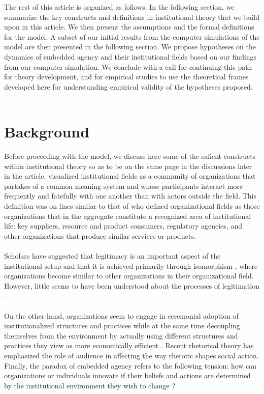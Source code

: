 \documentclass[12pt,letterpaper]{article}
\begin{document}
\noindent The rest of this article is organized as follows. In the following section, we summarize the key constructs and definitions in institutional theory that we build upon in this article. We then present the assumptions and the formal definitions for the model. A subset of our initial results from the computer simulations of the model are then presented in the following section. We propose hypotheses on the dynamics of embedded agency and their institutional fields based on our findings from our computer simulation. We conclude with a call for continuing this path for theory development, and for empirical studies to use the theoretical frames developed here for understanding empirical validity of the hypotheses proposed.\\\\

\section{Background}
Before proceeding with the model, we discuss here some of the salient constructs within institutional theory so as to be on the same page in the discussions later in the article. \cite{Scott1995} visualized institutional fields as a community of organizations that partakes of a common meaning system and whose participants interact more frequently and fatefully with one another than with actors outside the field. This definition was on lines similar to that of \cite{Dimaggio1983} who defined organizational fields as those organizations that in the aggregate constitute a recognized area of institutional life: key suppliers, resource and product consumers, regulatory agencies, and other organizations that produce similar services or products. \\\\
Scholars have suggested that legitimacy is an important aspect of the institutional setup and that it  is achieved primarily through isomorphism \citep{Kostova2008}, where organizations become similar to other organizations in their organizational field. However, little seems to have been understood about the processes of legitimation \citep{Harmon2015}. \\\\
On the other hand, organizations seem to engage in ceremonial adoption of institutionalized structures and practices while at the same time decoupling themselves from the environment by actually using different structures and practices they view as more economically efficient \citep{Kostova2008}. Recent rhetorical theory has emphasized the role of audience in affecting the way rhetoric shapes social action. Finally, the paradox of embedded agency refers  to the following tension: how can organizations or individuals innovate if their beliefs and actions are determined by the institutional environment they wish to change \citep{Scott1987}? \\\\
\end{document}
